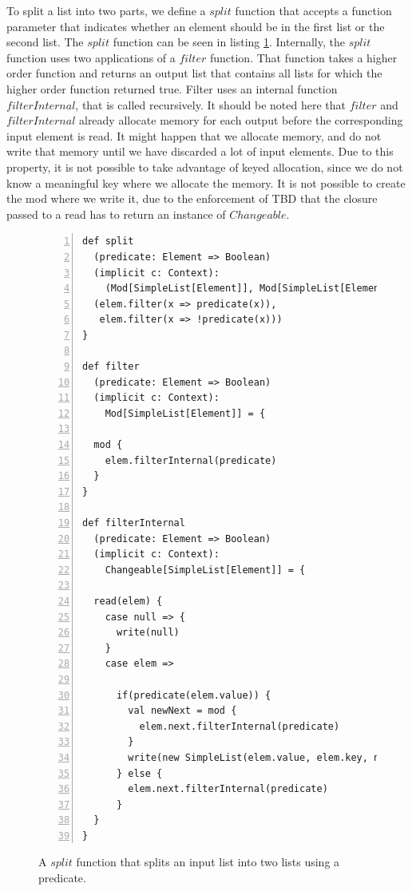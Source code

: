To split a list into two parts, we define a $split$ function that accepts a function parameter that indicates whether an element should be in the first list or the second list. The $split$ function can be seen in listing \ref{code:split_filter}. Internally, the $split$ function uses two applications of a $filter$ function. That function takes a higher order function and returns an output list that contains all lists for which the higher order function returned true. Filter uses an internal function $filterInternal$, that is called recursively. It should be noted here that $filter$ and $filterInternal$ already allocate memory for each output before the corresponding input element is read. It might happen that we allocate memory, and do not write that memory until we have discarded a lot of input elements. Due to this property, it is not possible to take advantage of keyed allocation, since we do not know a meaningful key where we allocate the memory. It is not possible to create the mod where we write it, due to the enforcement of TBD that the closure passed to a read has to return an instance of $Changeable$. 

\begin{figure}
\begin{lstlisting}[frame=single,basicstyle=\ttfamily,numbers=left,mathescape=true]
def split
  (predicate: Element => Boolean)
  (implicit c: Context):
    (Mod[SimpleList[Element]], Mod[SimpleList[Element]]) = {
  (elem.filter(x => predicate(x)), 
   elem.filter(x => !predicate(x)))
}

def filter
  (predicate: Element => Boolean)
  (implicit c: Context):
    Mod[SimpleList[Element]] = {

  mod {
    elem.filterInternal(predicate)
  }
}

def filterInternal
  (predicate: Element => Boolean)
  (implicit c: Context):
    Changeable[SimpleList[Element]] = {

  read(elem) {
    case null => {
      write(null)
    }
    case elem =>

      if(predicate(elem.value)) {
        val newNext = mod {
          elem.next.filterInternal(predicate)
        }
        write(new SimpleList(elem.value, elem.key, newNext))
      } else {
        elem.next.filterInternal(predicate)
      }
  }
}

\end{lstlisting}
\caption{A $split$ function that splits an input list into two lists using a predicate.}
\label{code:split_filter}
\end{figure}

